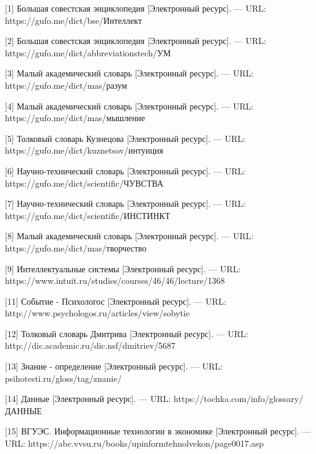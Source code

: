 \documentclass[14pt,a4paper,report]{report}
\begin{document}
\begin{flushleft}

[1] Большая совестская энциклопедия [Электронный ресурс]. — URL: https://gufo.me/dict/bse/Интеллект

[2] Большая совестская энциклопедия  [Электронный ресурс]. — URL: https://gufo.me/dict/abbreviationstech/УМ

[3] Малый академический словарь [Электронный ресурс]. — URL: https://gufo.me/dict/mas/разум


[4] Малый академический словарь [Электронный ресурс]. — URL: https://gufo.me/dict/mas/мышление

[5] Толковый словарь Кузнецова [Электронный ресурс]. — URL: https://gufo.me/dict/kuznetsov/интуиция

[6] Научно-технический словарь [Электронный ресурс]. — URL: https://gufo.me/dict/scientific/ЧУВСТВА


[7] Научно-технический словарь [Электронный ресурс]. — URL: https://gufo.me/dict/scientific/ИНСТИНКТ

[8] Малый академический словарь [Электронный ресурс]. — URL: https://gufo.me/dict/mas/творчество

[9] Интеллектуальные системы [Электронный ресурс]. — URL: https://www.intuit.ru/studies/courses/46/46/lecture/1368


[11] Событие - Психологос [Электронный ресурс]. — URL: http://www.psychologos.ru/articles/view/sobytie

[12] Толковый словарь Дмитрива [Электронный ресурс]. — URL: http://dic.academic.ru/dic.nsf/dmitriev/5687

[13] Знание - определение [Электронный ресурс]. — URL: psihotesti.ru/gloss/tag/znanie/

[14] Данные [Электронный ресурс]. — URL: https://tochka.com/info/glossary/ДАННЫЕ

[15] ВГУЭС. Информационные технологии в экономике [Электронный ресурс]. — URL: https://abc.vvsu.ru/books/upinformtehnolvekon/page0017.asp

\end{flushleft}
	
\end{document}
